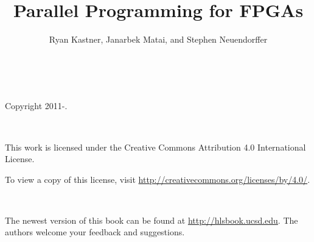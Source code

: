 \documentclass[
  a4paper,	      %
	11pt,           %
  parskip=half*,  %
]{scrbook}
\title{Parallel Programming for FPGAs}
\author{Ryan Kastner, Janarbek Matai, and Stephen Neuendorffer\\\note{Notes are enabled}}
\newcommand{\note}[1]{}
\begin{document}
\setlength{\emergencystretch}{5em}
\setlength{\fboxrule}{1pt}
\setlength{\fboxsep}{9pt}

\setlength{\FrameRule}{\fboxrule}
\setlength{\FrameSep}{\fboxsep}


\newpage\leavevmode\thispagestyle{empty}\newpage

\maketitle
{} \ \\
\begin{center}
\setlength{\parskip}{0.5\baselineskip}
Copyright 2011-\the\year.
\end{center}
\vspace*{20mm} \ \\
\begin{minipage}{\linewidth}
This work is licensed under the Creative Commons Attribution 4.0 International License.

To view a copy of this license, visit \url{http://creativecommons.org/licenses/by/4.0/}. 
\end{minipage}
\vspace*{20mm} \ \\
\begin{minipage}{\linewidth}
The newest version of this book can be found at \url{http://hlsbook.ucsd.edu}.  The authors welcome your feedback and suggestions.
\end{minipage}
 \ \\
\newpage
\tableofcontents
\newpage
















%
%


 
\printnoidxglossaries
\end{document}
